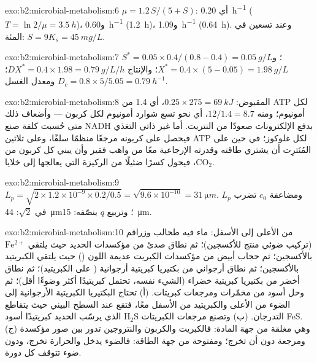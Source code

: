 \begin{solution}{exo:b2:microbial-metabolism:6}
$\mu = 1.2\,S/(5 + S)$: أي \qty{0.20}{h^{-1}} ($T = \ln 2/\mu =
\qty{3.5}{h}$)، و\qty{0.60}{h^{-1}} (\qty{1.2}{h})، و\qty{1.09}{h^{-1}}
(\qty{0.64}{h}). وعند تسعين في المئة: $S = 9K_s = \qty{45}{mg/L}$.
\end{solution}

\begin{solution}{exo:b2:microbial-metabolism:7}
$S^* = 0.05\times 0.4/(0.8 - 0.4) = \qty{0.05}{g/L}$؛ و$X^* =
0.4\times(5 - 0.05) = \qty{1.98}{g/L}$؛ والإنتاج $DX^* = 0.4\times
1.98 = \qty{0.79}{g/L/h}$؛ ومعدل الغسل $D_c = 0.8\times 5/5.05 =
\qty{0.79}{h^{-1}}$.
\end{solution}

\begin{solution}{exo:b2:microbial-metabolism:8}
المقبوض: $0.25\times 275 = \qty{69}{kJ}$، أي 1.4 من ATP لكل
أمونيوم؛ ومنه $12/1.4 = 8.7$، أي نحو تسع شوارد أمونيوم لكل كربون
--- وأضعاف ذلك متى حُسبت كلفة صنع NADH بدفع الإلكترونات صعودًا من
النتريت. أما غير ذاتي التغذي فيحصل على كربونه مرجعًا منظمًا سلفًا،
وعلى ثلاثين ATP لكل غلوكوز؛ في حين على المُنَترِت أن يشتري طاقته
وقدرته الإرجاعية معًا من واهب فقير وأن يبني كل كربون من
$\mathrm{CO_2}$، فيحول كسرًا ضئيلًا من الركيزة التي يعالجها إلى
خلايا.
\end{solution}

\begin{solution}{exo:b2:microbial-metabolism:9}
$L_p = \sqrt{2\times 1.2\times 10^{-9}\times 0.2/0.5} =
\sqrt{9.6\times 10^{-10}} = \qty{31}{\micro m}$. ومضاعفة $c_0$ تضرب
$L_p$ في $\sqrt 2$: \qty{44}{\micro m}؛ وتربيع $q$ ينصّفه:
\qty{15}{\micro m}.
\end{solution}

\begin{solution}{exo:b2:microbial-metabolism:10}
من الأعلى إلى الأسفل: ماء فيه طحالب وزراقم (تركيب ضوئي منتج
للأكسجين)؛ ثم نطاق صدئ من مؤكسدات الحديد حيث يلتقي $\mathrm{Fe^{2+}}$
بالأكسجين؛ ثم حجاب أبيض من مؤكسدات الكبريت عديمة اللون
() حيث يلتقي الكبريتيد بالأكسجين؛ ثم نطاق
أرجواني من بكتيريا كبريتية أرجوانية (
على الكبريتيد)؛ ثم نطاق أخضر من بكتيريا كبريتية خضراء (الشيء نفسه،
تحتمل كبريتيدًا أكثر وضوءًا أقل)؛ ثم وحل أسود من مخمّرات ومرجعات
كبريتات. (أ) تحتاج البكتيريا الكبريتية الأرجوانية إلى الضوء من
الأعلى والكبريتيد من الأسفل معًا، فتقع عند السطح البيني حيث يتقاطع
التدرجان. (ب) وتصنع مرجعات الكبريتات $\mathrm{H_2S}$ الذي يرسّب
الحديد كبريتيدًا أسود FeS. (ج) وهي مغلقة من جهة المادة: فالكبريت
والكربون والنتروجين تدور بين صور مؤكسدة ومرجعة دون أن تخرج؛ ومفتوحة
من جهة الطاقة: فالضوء يدخل والحرارة تخرج، ودون ضوء تتوقف كل دورة.
\end{solution}

